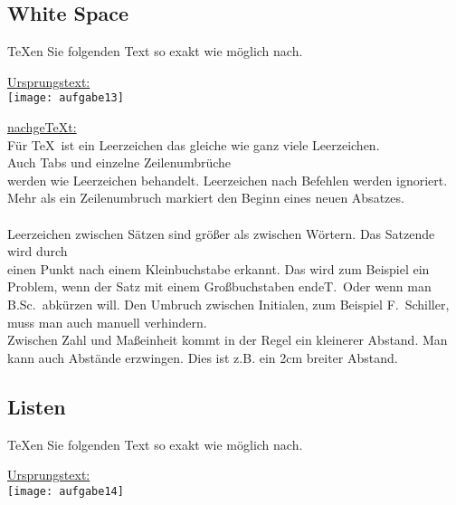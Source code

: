 \pagebreak
\subsection{White Space}
\normalsize
\begin{aufgabe}
\TeX en Sie folgenden Text so exakt wie m\"oglich nach.	
\end{aufgabe}

\noindent \underline{Ursprungstext:} \\
\noindent\texttt{[image: aufgabe13]}

\noindent \underline{nachge\TeX t:}\\
\normalsize
\onehalfspacing
\indent Für \TeX \ ist ein Leerzeichen das gleiche wie ganz viele \hfill Leerzeichen.\\
\setlength{\parindent}{12mm} \indent 
Auch Tabs und einzelne Zeilenumbrüche\\
werden wie Leerzeichen behandelt. Leerzeichen nach Befehlen werden ignoriert.
Mehr als ein Zeilenumbruch markiert den Beginn eines neuen Absatzes.\\
\\
Leerzeichen zwischen Sätzen sind größer als zwischen Wörtern. Das Satzende wird durch\\
einen Punkt nach einem Kleinbuchstabe erkannt.\linebreak
Das wird zum Beispiel ein Problem, wenn der Satz mit einem Großbuchstaben endeT.\
Oder wenn man B.Sc.\ abkürzen will.
Den Umbruch zwischen Initialen, zum Beispiel F.~Schiller, muss man auch manuell verhindern.\\
\hspace*{4mm} Zwischen Zahl und Maßeinheit kommt in der Regel ein kleinerer Abstand.
Man kann auch Abstände erzwingen.
Dies ist z.B. ein 2cm breiter \hspace{2cm} Abstand.

\pagebreak
\subsection{Listen}
\begin{aufgabe}
\TeX en Sie folgenden Text so exakt wie m\"oglich nach.	
\end{aufgabe}

\noindent \underline{Ursprungstext:} \\
\texttt{[image: aufgabe14]}

